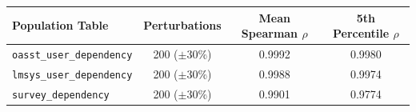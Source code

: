\begin{tabular}{@{}lccc@{}}
\toprule
Population Table & Perturbations & Mean Spearman $\rho$ & 5th Percentile $\rho$ \\
\midrule
\texttt{oasst\_user\_dependency} & 200 ($\pm 30\%$) & 0.9992 & 0.9980 \\
\texttt{lmsys\_user\_dependency} & 200 ($\pm 30\%$) & 0.9988 & 0.9974 \\
\texttt{survey\_dependency} & 200 ($\pm 30\%$) & 0.9901 & 0.9774 \\
\bottomrule
\end{tabular}